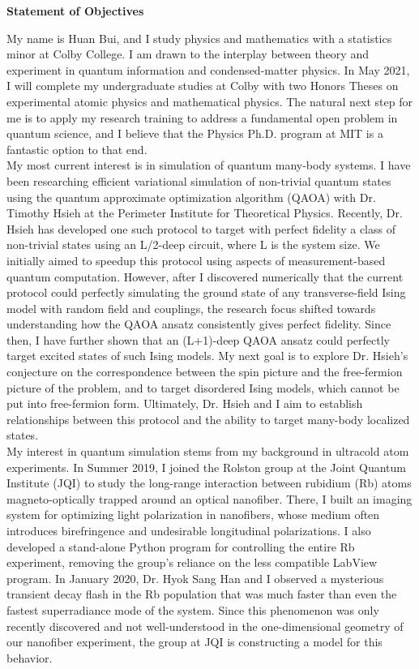 \documentclass[12pt]{article}
\begin{document}
\begin{center}
	\textbf{Statement of Objectives}
\end{center}
My name is Huan Bui, and I study physics and mathematics with a statistics minor at Colby College. I am drawn to the interplay between theory and experiment in quantum information and condensed-matter physics.  In May 2021, I will complete my undergraduate studies at Colby with two Honors Theses on experimental atomic physics and mathematical physics. The natural next step for me is to apply my research training to address a fundamental open problem in quantum science, and I believe that the Physics Ph.D. program at MIT is a fantastic option to that end.  \\ 

My most current interest is in simulation of quantum many-body systems. I have been researching efficient variational simulation of non-trivial quantum states using the quantum approximate optimization algorithm (QAOA) with Dr. Timothy Hsieh at the Perimeter Institute for Theoretical Physics. Recently, Dr. Hsieh has developed one such protocol to target with perfect fidelity a class of non-trivial states using an L/2-deep circuit, where L is the system size. We initially aimed to speedup this protocol using aspects of measurement-based quantum computation. However, after I discovered numerically that the current protocol could perfectly simulating the ground state of any transverse-field Ising model with random field and couplings, the research focus shifted towards understanding how the QAOA ansatz consistently gives perfect fidelity. Since then, I have further shown that an (L+1)-deep QAOA ansatz could perfectly target excited states of such Ising models. My next goal is to explore Dr. Hsieh's conjecture on the correspondence between the spin picture and the free-fermion picture of the problem, and to target disordered Ising models, which cannot be put into free-fermion form. Ultimately, Dr. Hsieh and I aim to establish relationships between this protocol and the ability to target many-body localized states.\\

My interest in quantum simulation stems from my background in ultracold atom experiments. In Summer 2019, I joined the Rolston group at the Joint Quantum Institute (JQI) to study the long-range interaction between rubidium (Rb) atoms magneto-optically trapped around an optical nanofiber. There, I built an imaging system for optimizing light polarization in nanofibers, whose medium often introduces birefringence and undesirable longitudinal polarizations. I also developed a stand-alone Python program for controlling the entire Rb experiment, removing the group's reliance on the less compatible LabView program. In January 2020, Dr. Hyok Sang Han and I observed a mysterious transient decay flash in the Rb population that was much faster than even the fastest superradiance mode of the system. Since this phenomenon was only recently discovered and not well-understood in the one-dimensional geometry of our nanofiber experiment, the group at JQI is constructing a model for this behavior.   \\ 
\end{document}
